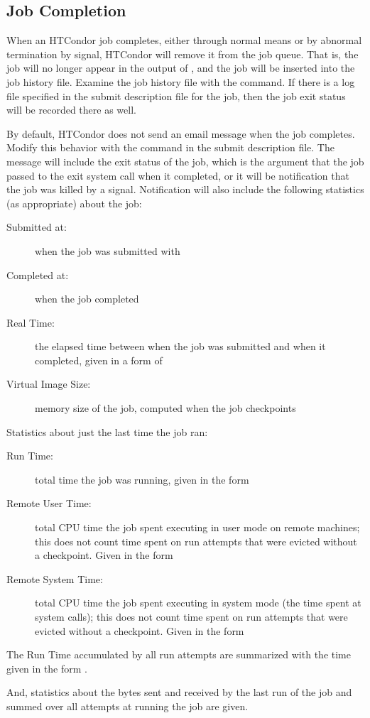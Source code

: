 \subsection{\label{sec:job-completion}Job Completion}

When an HTCondor job completes,
either through normal means or by abnormal termination by signal,
HTCondor will remove it from the job queue.
That is,
the job will no longer appear in the output of ,
and the job will be inserted into the job history file.
Examine the job history file with the  command. 
If there is a log file specified in the submit description file for the job, 
then the job exit status will be recorded there as well.

By default, HTCondor does not send an email message when the job completes.
Modify this behavior with the
 command in the submit description file.
The message will include the exit status of the job,
which is the argument that the job passed to the exit system call 
when it completed,
or it will be notification that the job was killed by a signal.  
Notification will also
include the following statistics (as appropriate) about the job:

\begin{description}

\item[Submitted at:] when the job was submitted with 

\item[Completed at:] when the job completed

\item[Real Time:] the elapsed time between when the job was submitted and
when it completed, given in a form of 

\item[Virtual Image Size:] memory size of the job, computed when the
job checkpoints

\end{description}

Statistics about just the last time the job ran:

\begin{description}
\item[Run Time:] total time the job was running,
given in the form 

\item[Remote User Time:] total CPU time the job spent
executing in user mode on remote machines; 
this does not count time spent on run attempts that were evicted 
without a checkpoint.
Given in the form 

\item[Remote System Time:] total CPU time the job spent
executing in system mode (the time spent at system calls);
this does not count time spent on run attempts that were evicted 
without a checkpoint.  
Given in the form 

\end{description}

The Run Time accumulated by all run attempts are summarized with
the time given in the form .

And, statistics about the bytes sent and received by the last
run of the job and summed over all attempts at running the job
are given.
